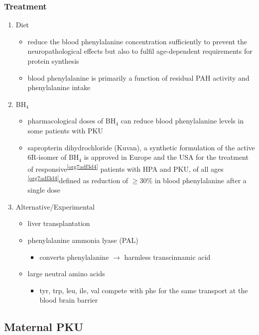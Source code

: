 \documentclass{scrartcl}
\begin{document}
\subsubsection{Treatment}
\label{sec:org294b759}
\begin{enumerate}
\item Diet
\label{sec:org1f3c35e}
\begin{itemize}
\item reduce the blood phenylalanine concentration sufficiently to prevent the
neuropathological effects but also to fulfil age-dependent
requirements for protein synthesis
\item blood phenylalanine is primarily a function of residual PAH activity and phenylalanine
intake
\end{itemize}
\item BH\(_{\text{4}}\)
\label{sec:org56e758e}
\begin{itemize}
\item pharmacological doses of BH\(_{\text{4}}\) can reduce blood phenylalanine levels
in some patients with PKU
\item sapropterin dihydrochloride (Kuvan), a synthetic formulation of the
active 6R-isomer of BH\(_{\text{4}}\) is approved in Europe and the USA for the
treatment of responsive\textsuperscript{\ref{org7adf3d4}} patients with HPA and PKU, of all
ages \textsuperscript{\ref{org7adf3d4}}defined as reduction of \(\ge\)30\% in blood phenylalanine
after a single dose
\end{itemize}
\item Alternative/Experimental
\label{sec:orgf1c7e4f}
\begin{itemize}
\item liver transplantation
\item phenylalanine ammonia lyase (PAL)
\begin{itemize}
\item converts phenylalanine \(\to\) harmless transcinnamic acid
\end{itemize}
\item large neutral amino acids
\begin{itemize}
\item tyr, trp, leu, ile, val compete with phe for the same transport at
the blood brain barrier
\end{itemize}
\end{itemize}
\end{enumerate}

\subsection{Maternal PKU}
\label{sec:org397ffc9}
\end{document}
